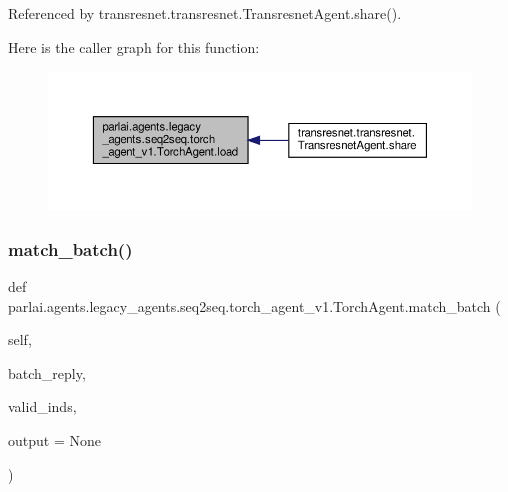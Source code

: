 Referenced by transresnet.\+transresnet.\+Transresnet\+Agent.\+share().

Here is the caller graph for this function\+:
\nopagebreak
\begin{figure}[H]
\begin{center}
\leavevmode
\includegraphics[width=350pt]{classparlai_1_1agents_1_1legacy__agents_1_1seq2seq_1_1torch__agent__v1_1_1TorchAgent_a6d71ad7997e048e4f4f7d957fae64ac5_icgraph}
\end{center}
\end{figure}
\mbox{\label{classparlai_1_1agents_1_1legacy__agents_1_1seq2seq_1_1torch__agent__v1_1_1TorchAgent_acac419cfad0fc5988e7e796c244f3a9f}} 
\subsubsection{\texorpdfstring{match\+\_\+batch()}{match\_batch()}}
{\footnotesize\ttfamily def parlai.\+agents.\+legacy\+\_\+agents.\+seq2seq.\+torch\+\_\+agent\+\_\+v1.\+Torch\+Agent.\+match\+\_\+batch (\begin{DoxyParamCaption}\item[{}]{self,  }\item[{}]{batch\+\_\+reply,  }\item[{}]{valid\+\_\+inds,  }\item[{}]{output = {\ttfamily None} }\end{DoxyParamCaption})}


